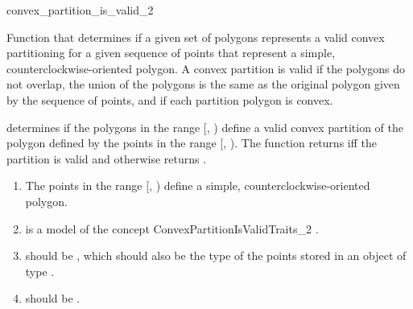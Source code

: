 \renewcommand\ccRefPageBegin{\ccParDims\cgalColumnLayout\begin{ccAdvanced}}
\renewcommand\ccRefPageEnd{\ccParDims\cgalColumnLayout\end{ccAdvanced}}
\begin{ccRefFunction}{convex_partition_is_valid_2}

\ccDefinition
Function that determines if a given set of polygons represents
a valid convex partitioning for a given sequence of points that represent a
simple, counterclockwise-oriented polygon.  
A convex partition is valid if the 
polygons do not overlap, the union of the polygons is the same as the original
polygon given by the sequence of points, and if each partition polygon is 
convex. 


{
determines if the polygons in the range [, )
define a valid convex partition of the polygon defined by the points in the 
range [, ). 
The function returns  iff the partition is valid and otherwise
returns .
}

\begin{enumerate}
    \item The points in the range [, ) define
          a simple, counterclockwise-oriented polygon.
    \item {} is a model of the concept
          ConvexPartitionIsValidTraits\_2%
          .
    \item {} should be ,
          which should also be the type of the points stored in an object
          of type .
    \item {} should be 
          .
\end{enumerate}


\end{ccRefFunction}
